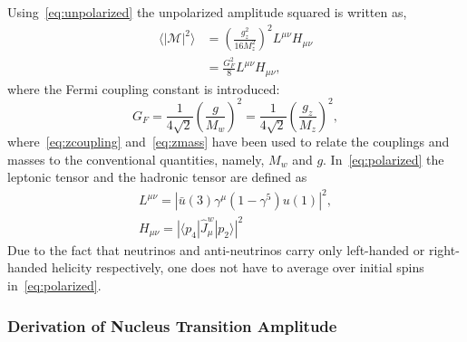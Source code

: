 Using~\eqref{eq:unpolarized} the unpolarized amplitude squared is written as,
\begin{align}
\langle |\mathcal{M}|^2 \rangle &=\left( \frac{g_z^2}{16M_z^2} \right) ^2 L^{\mu \nu}H_{\mu \nu} \nonumber \\
&= \frac{G_F^2}{8} L^{\mu \nu}H_{\mu \nu}, \label{eq:polarized}
\end{align}
where the Fermi coupling constant is introduced:
\begin{equation}
G_F=\frac{1}{4\sqrt{2}}\left( \frac{g}{M_w}\right) ^2=\frac{1}{4\sqrt{2}}\left( \frac{g_z}{M_z}\right) ^2,
\end{equation}
where~\eqref{eq:zcoupling} and~\eqref{eq:zmass} have been used to relate the couplings and masses to the conventional quantities, namely, $M_w$ and $g$. In~\eqref{eq:polarized} the leptonic tensor and the hadronic tensor are defined as
\begin{gather}
L^{\mu \nu}= |\bar{u}(3)\gamma ^{\mu}(1-\gamma ^{5})u(1)|^2, \label{eq:leptonic} \\
H_{\mu \nu}= |\langle p_4|\hat{J}_{\mu}^{w}|p_2 \rangle |^2 \label{eq:hadronic}
\end{gather}
Due to the fact that neutrinos and anti-neutrinos carry only left-handed or right-handed helicity respectively, one does not have to average over initial spins in~\eqref{eq:polarized}.

\subsubsection{Derivation of Nucleus Transition Amplitude}

